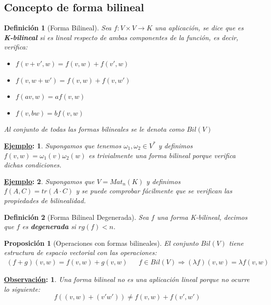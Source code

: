 \documentclass[10pt,a4paper,openright]{book}
\theoremstyle{break}
\newtheorem*{defi}{Definición}
\newtheorem*{prop}{Proposición}
\newtheorem*{obs}{\underline{Observación}:}
\newtheorem*{ej}{\underline{Ejemplo}:}
\begin{document}
\subsection{Concepto de forma bilineal}
\begin{defi}[Forma Bilineal]
Sea $f: V\times V\rightarrow K$ una aplicación, se dice que es \textbf{K-bilineal} si es lineal respecto de ambas componentes de la función, es decir, verifica:
\begin{itemize}
\item $f(v+v',w) = f(v,w)+f(v',w)$
\item $f(v, w+w') = f(v,w)+f(v,w')$
\item $f(av, w)= a f(v,w)$
\item $f(v,bw)=bf(v,w)$
\end{itemize}
Al conjunto de todas las formas bilineales se le denota como $Bil(V)$
\end{defi}

\begin{ej}
Supongamos que tenemos $\omega_1, \omega_2\in V^*$ y definimos $f(v,w)=\omega_1(v)\omega_2(w)$ es trivialmente una forma bilineal porque verifica dichas condiciones.
\end{ej}

\begin{ej}
Supongamos que $V=Mat_n(K)$ y definimos $f(A,C)=tr(A\cdot C)$ y se puede comprobar fácilmente que se verifican las propiedades de bilinealidad.
\end{ej}

\begin{defi}[Forma Bilineal Degenerada]
Sea $f$ una forma K-bilineal, decimos que $f$ es \textbf{degenerada} si $rg(f)< n$.
\end{defi}

\begin{prop}[Operaciones con formas bilineales]
El conjunto $Bil(V)$ tiene estructura de espacio vectorial con las operaciones:
\begin{align*}
(f+g)(v,w)=f(v,w)+g(v,w) & & f\in Bil(V)\Rightarrow (\lambda f)(v,w)=\lambda f(v,w)
\end{align*}
\end{prop}

\begin{obs}
Una forma bilineal no es una aplicación lineal porque no ocurre lo siguiente:
$$f((v,w)+(v'w'))\neq f(v,w)+f(v',w')$$
\end{obs}
\end{document}
